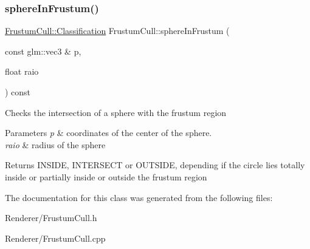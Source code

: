 \subsubsection{\texorpdfstring{sphereInFrustum()}{sphereInFrustum()}}
{\footnotesize\ttfamily \mbox{\hyperlink{class_frustum_cull_ac3f2e416581ca09b43008ac4acabc508}{Frustum\+Cull\+::\+Classification}} Frustum\+Cull\+::sphere\+In\+Frustum (\begin{DoxyParamCaption}\item[{const glm\+::vec3 \&}]{p,  }\item[{float}]{raio }\end{DoxyParamCaption}) const}

Checks the intersection of a sphere with the frustum region


\begin{DoxyParams}{Parameters}
{\em p} & coordinates of the center of the sphere. \\
\hline
{\em raio} & radius of the sphere \\
\hline
\end{DoxyParams}
\begin{DoxyReturn}{Returns}
I\+N\+S\+I\+DE, I\+N\+T\+E\+R\+S\+E\+CT or O\+U\+T\+S\+I\+DE, depending if the circle lies totally inside or partially inside or outside the frustum region 
\end{DoxyReturn}


The documentation for this class was generated from the following files\+:\begin{DoxyCompactItemize}
\item 
Renderer/Frustum\+Cull.\+h\item 
Renderer/Frustum\+Cull.\+cpp\end{DoxyCompactItemize}
